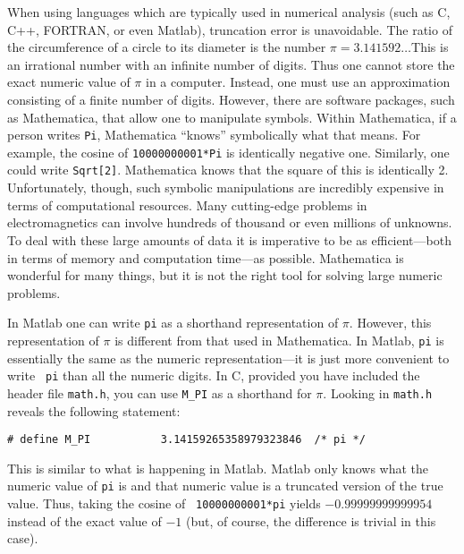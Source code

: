 When using languages which are typically used in numerical analysis
(such as C, C++, FORTRAN, or even Matlab), truncation error is
unavoidable.  The ratio of the circumference of a circle to its
diameter is the number $\pi=3.141592\ldots$\@ This is an irrational
number with an infinite number of digits.  Thus one cannot store the
exact numeric value of $\pi$ in a computer.  Instead, one must use an
approximation consisting of a finite number of digits.  However, there
are software packages, such as Mathematica, that allow one to
manipulate symbols.  Within Mathematica, if a person writes {\tt Pi},
Mathematica ``knows'' symbolically what that means.  For example, the
cosine of {\tt 10000000001*Pi} is identically negative one.
Similarly, one could write {\tt Sqrt[2]}.  Mathematica knows that the
square of this is identically 2.  Unfortunately, though, such symbolic
manipulations are incredibly expensive in terms of computational
resources.  Many cutting-edge problems in electromagnetics can involve
hundreds of thousand or even millions of unknowns.  To deal with these
large amounts of data it is imperative to be as efficient---both in
terms of memory and computation time---as possible.  Mathematica is
wonderful for many things, but it is not the right tool for solving
large numeric problems.

In Matlab one can write {\tt pi} as a shorthand representation of
$\pi$.  However, this representation of $\pi$ is different from that
used in Mathematica.  In Matlab, {\tt pi} is essentially the same as
the numeric representation---it is just more convenient to write {\tt
pi} than all the numeric digits.  In C, provided you have included the
header file {\tt math.h}, you can use {\tt M\_PI} as a shorthand for
$\pi$.  Looking in {\tt math.h} reveals the following statement:
\begin{verbatim}
# define M_PI           3.14159265358979323846  /* pi */
\end{verbatim}
This is similar to what is happening in Matlab.  Matlab only knows
what the numeric value of {\tt pi} is and that numeric value is a
truncated version of the true value.  Thus, taking the cosine of {\tt
10000000001*pi} yields $-0.99999999999954$ instead of the exact value
of $-1$ (but, of course, the difference is trivial in this case).

